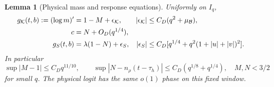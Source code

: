 \documentclass[11pt]{article}
\numberwithin{equation}{section}
\newtheorem{lemma}[theorem]{Lemma}
\newcommand{\KK}{\mathcal K}\newcommand{\BB}{\mathcal B}
\begin{document}
\begin{lemma}[Physical mass and response equations]
\label{an07fwcv1:massfine}
Uniformly on \(I_q\),
\begin{align}
 g_\KK(t,b):=(\log m)'&=1-M+\epsilon_\KK,
 &|\epsilon_\KK|&\le C_D(q^2+\mu_\BB),\notag\\
 c&=N+O_D(q^{1/4}),\label{an07fwcv1:cN}\\
 g_S(t,b)&=\lambda(1-N)+\epsilon_S,
 &|\epsilon_S|&\le C_D[q^{1/4}+q^2(1+|u|+|v|)^2].
 \label{an07fwcv1:reactions}
\end{align}
In particular
\begin{equation}
 \sup|M-1|\le C_Dq^{11/10},\qquad
 \sup|N-n_\rho(t-\tau_h)|\le C_D(q^{1/8}+q^{1/4}),
 \quad M,N<3/2
 \label{an07fwcv1:masslogistic}
\end{equation}
for small \(q\). The physical logit has the same \(o(1)\) phase
on this fixed window.
\end{lemma}
\end{document}

